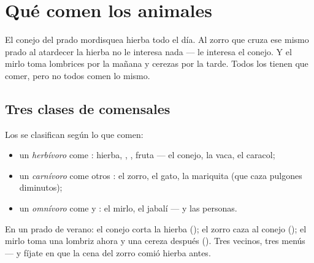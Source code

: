 \chapter{Qué comen los animales}\label{ch:g2:what-animals-eat}

El conejo del prado mordisquea hierba todo el día. Al zorro que cruza
ese mismo prado al atardecer la hierba no le interesa nada --- le
interesa el conejo. Y el mirlo toma lombrices por la mañana y cerezas
por la tarde. Todos los  tienen que comer, pero no todos comen
lo mismo.

\section{Tres clases de comensales}

\begin{definition}\label{def:g2:what-animals-eat:kinds}
Los  se clasifican según lo que comen:
\begin{itemize}
  \item un \emph{herbívoro} come : hierba,
        , , fruta --- el conejo, la vaca, el caracol;
  \item un \emph{carnívoro} come otros : el
        zorro, el gato, la mariquita (que caza pulgones diminutos);
  \item un \emph{omnívoro} come  y :
        el mirlo, el jabalí --- y las personas.
\end{itemize}
\end{definition}

\begin{example}\label{ex:g2:what-animals-eat:meadow}
En un prado de verano: el conejo corta la hierba (); el zorro
caza al conejo (); el mirlo toma una lombriz ahora y una
cereza después (). Tres vecinos, tres menús --- y fíjate en que
la cena del zorro comió hierba antes.
\end{example}

